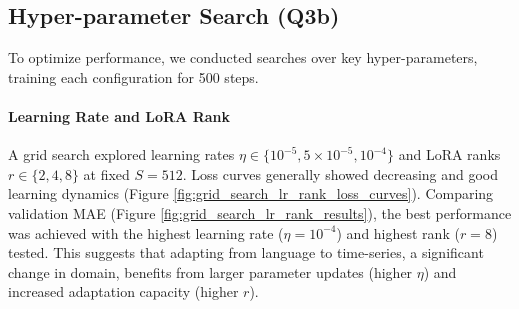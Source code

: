 \documentclass{article}
\begin{document}
\subsection{Hyper-parameter Search (Q3b)}

To optimize performance, we conducted searches over key hyper-parameters, training each configuration for 500 steps.

\paragraph{Learning Rate and LoRA Rank}
A grid search explored learning rates $\eta \in \{10^{-5}, 5 \times 10^{-5}, 10^{-4}\}$ and LoRA ranks $r \in \{2, 4, 8\}$ at fixed $S=512$. Loss curves generally showed decreasing and good learning dynamics (Figure \ref{fig:grid_search_lr_rank_loss_curves}). Comparing validation MAE (Figure \ref{fig:grid_search_lr_rank_results}), the best performance was achieved with the highest learning rate ($\eta=10^{-4}$) and highest rank ($r=8$) tested. This suggests that adapting from language to time-series, a significant change in domain, benefits from larger parameter updates (higher $\eta$) and increased adaptation capacity (higher $r$).
\end{document}
